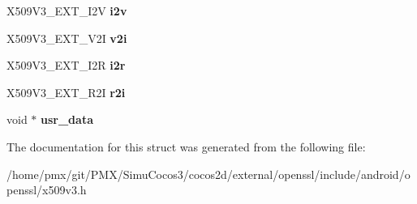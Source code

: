 \begin{DoxyCompactItemize}
X509\+V3\+\_\+\+E\+X\+T\+\_\+\+I2V {\bfseries i2v}
\item 
\mbox{\label{structv3__ext__method_ab0699c47258c61200f7189fe888f7aab}} 
X509\+V3\+\_\+\+E\+X\+T\+\_\+\+V2I {\bfseries v2i}
\item 
\mbox{\label{structv3__ext__method_aa61cb3a7c7bfe70f813857485e9a4e02}} 
X509\+V3\+\_\+\+E\+X\+T\+\_\+\+I2R {\bfseries i2r}
\item 
\mbox{\label{structv3__ext__method_a58e1a54a66185f358d7859e771a9a39a}} 
X509\+V3\+\_\+\+E\+X\+T\+\_\+\+R2I {\bfseries r2i}
\item 
\mbox{\label{structv3__ext__method_a3ee54bb576e4e63e1ee5bf99f625030c}} 
void $\ast$ {\bfseries usr\+\_\+data}
\end{DoxyCompactItemize}


The documentation for this struct was generated from the following file\+:\begin{DoxyCompactItemize}
\item 
/home/pmx/git/\+P\+M\+X/\+Simu\+Cocos3/cocos2d/external/openssl/include/android/openssl/x509v3.\+h\end{DoxyCompactItemize}
